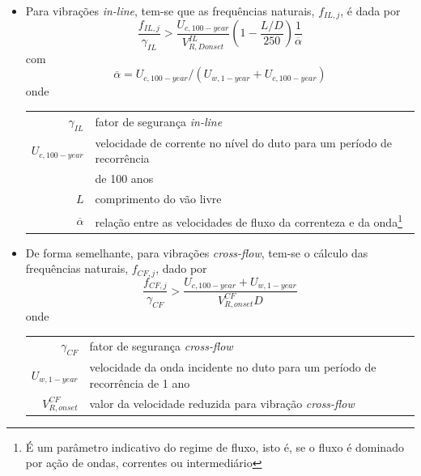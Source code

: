 \begin{itemize}
	\item Para vibrações \textit{in-line}, tem-se que as frequências naturais, $f_{\mathit{IL},j}$, é dada por
	\begin{equation}
	\label{eq:jdsn-eqil}
	\frac{f_{\mathit{IL},j}}{\gamma_\mathit{IL}} > \frac{U_{c,100-\mathit{year}}}{V_{R, D \mathit{onset}}^\mathit{IL}} \left( 1 - \frac{L/D}{250}\right) \frac{1}{\overline{\alpha}}
	\end{equation}
	com
	\begin{equation}
	\overline{\alpha} = {U_{c,100-\mathit{year}}}/{(U_{w,1-\mathit{year}} + U_{c,100-\mathit{year}})}
	\end{equation}
	onde

	\begin{tabular}{rl}
		$\gamma_\mathit{IL}$      & fator de segurança \textit{in-line}\\
		$U_{c,100-\mathit{year}}$ & velocidade de corrente no nível do duto para um período de recorrência \\
		                          & de 100 anos\\
		$L$                       & comprimento do vão livre\\
		$\overline{\alpha}$       & relação entre as velocidades de fluxo da correnteza e da onda\footnote{É um parâmetro indicativo do regime de fluxo, isto é, se o fluxo é dominado por ação de ondas, correntes ou intermediário}
	\end{tabular}

	\item De forma semelhante, para vibrações \textit{cross-flow}, tem-se o cálculo das frequências naturais, $f_{\mathit{CF},j}$, dado por
	\begin{equation}
	\label{eq:jdsn-eqcf}
	\frac{f_{\mathit{CF},j}}{\gamma_\mathit{CF}} > \frac{U_{c,100-\mathit{year}} + U_{w,1-\mathit{year}}}{ V_{R,\mathit{onset}}^{\mathit{CF}} D}
	\end{equation}
	onde

	\begin{tabular}{rl}
		$\gamma_\mathit{CF}$               & fator de segurança \textit{cross-flow}\\
		$U_{w,1-\mathit{year}}$            & velocidade da onda incidente no duto para um período de recorrência de 1 ano\\
		$V_{R,\mathit{onset}}^\mathit{CF}$ & valor da velocidade reduzida para vibração \textit{cross-flow}
	\end{tabular}
\end{itemize}

